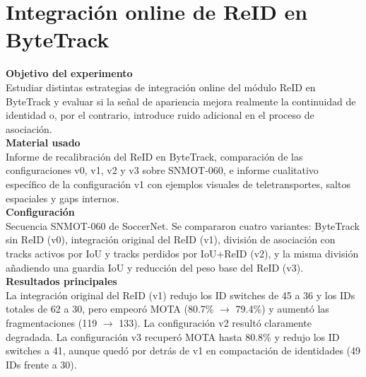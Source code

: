 \documentclass[../MAIN.tex]{subfiles}
\begin{document}
	
	
	\section{Integración online de ReID en ByteTrack}
	
	
	\begin{chaptertemplatebox}
		\textbf{Objetivo del experimento}\\
		Estudiar distintas estrategias de integración online del módulo ReID en ByteTrack y evaluar si la señal de apariencia mejora realmente la continuidad de identidad o, por el contrario, introduce ruido adicional en el proceso de asociación.\\[0.5em]
		
		\textbf{Material usado}\\
		Informe de recalibración del ReID en ByteTrack, comparación de las configuraciones v0, v1, v2 y v3 sobre SNMOT-060, e informe cualitativo específico de la configuración v1 con ejemplos visuales de teletransportes, saltos espaciales y gaps internos.\\[0.5em]
		
		\textbf{Configuración}\\
		Secuencia SNMOT-060 de SoccerNet. Se compararon cuatro variantes: ByteTrack sin ReID (v0), integración original del ReID (v1), división de asociación con tracks activos por IoU y tracks perdidos por IoU+ReID (v2), y la misma división añadiendo una guardia IoU y reducción del peso base del ReID (v3).\\[0.5em]
		
		\textbf{Resultados principales}\\
		La integración original del ReID (v1) redujo los ID switches de 45 a 36 y los IDs totales de 62 a 30, pero empeoró MOTA (80.7\% $\rightarrow$ 79.4\%) y aumentó las fragmentaciones (119 $\rightarrow$ 133). La configuración v2 resultó claramente degradada. La configuración v3 recuperó MOTA hasta 80.8\% y redujo los ID switches a 41, aunque quedó por detrás de v1 en compactación de identidades (49 IDs frente a 30).\\[0.5em]
		

\end{chaptertemplatebox}
\end{document}

